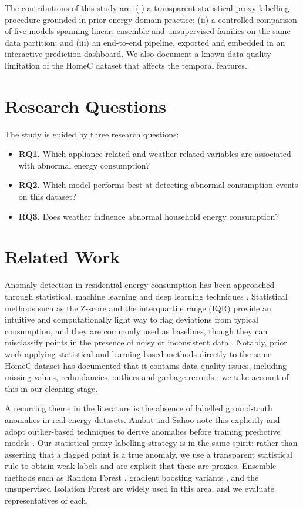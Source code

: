 \documentclass[pdflatex,sn-mathphys-num]{sn-jnl}%
\theoremstyle{thmstyleone}%
\theoremstyle{thmstyletwo}%
\theoremstyle{thmstylethree}%
\begin{document}
The contributions of this study are: (i) a transparent statistical proxy-labelling procedure grounded in prior energy-domain practice; (ii) a controlled comparison of five models spanning linear, ensemble and unsupervised families on the same data partition; and (iii) an end-to-end pipeline, exported and embedded in an interactive prediction dashboard. We also document a known data-quality limitation of the HomeC dataset that affects the temporal features.

\section{Research Questions}\label{sec2}

The study is guided by three research questions:

\begin{itemize}
\item \textbf{RQ1.} Which appliance-related and weather-related variables are associated with abnormal energy consumption?
\item \textbf{RQ2.} Which model performs best at detecting abnormal consumption events on this dataset?
\item \textbf{RQ3.} Does weather influence abnormal household energy consumption?
\end{itemize}

\section{Related Work}\label{sec3}

Anomaly detection in residential energy consumption has been approached through statistical, machine learning and deep learning techniques \cite{himeur2021}. Statistical methods such as the Z-score and the interquartile range (IQR) provide an intuitive and computationally light way to flag deviations from typical consumption, and they are commonly used as baselines, though they can misclassify points in the presence of noisy or inconsistent data \cite{abnormality2024}. Notably, prior work applying statistical and learning-based methods directly to the same HomeC dataset has documented that it contains data-quality issues, including missing values, redundancies, outliers and garbage records \cite{abnormality2024}; we take account of this in our cleaning stage.

A recurring theme in the literature is the absence of labelled ground-truth anomalies in real energy datasets. Ambat and Sahoo note this explicitly and adopt outlier-based techniques to derive anomalies before training predictive models \cite{ambat2025}. Our statistical proxy-labelling strategy is in the same spirit: rather than asserting that a flagged point is a true anomaly, we use a transparent statistical rule to obtain weak labels and are explicit that these are proxies. Ensemble methods such as Random Forest \cite{breiman2001random}, gradient boosting variants \cite{chen2016xgboost,ke2017lightgbm}, and the unsupervised Isolation Forest \cite{liu2008isolation} are widely used in this area, and we evaluate representatives of each.
\end{document}
